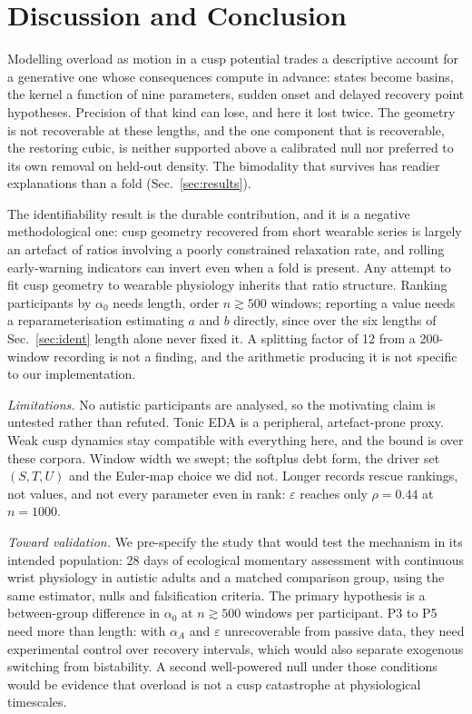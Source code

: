 \documentclass[conference]{IEEEtran}
\begin{document}
\section{Discussion and Conclusion}

Modelling overload as motion in a cusp potential trades a descriptive account
for a generative one whose consequences compute in advance: states become
basins, the kernel a function of nine parameters, sudden onset and delayed
recovery point hypotheses. Precision of that kind can lose, and here it lost twice. The geometry is not
recoverable at these lengths, and the one component that is recoverable, the
restoring cubic, is neither supported above a calibrated null nor preferred to
its own removal on held-out density. The bimodality that survives has readier
explanations than a fold (Sec.~\ref{sec:results}).

The identifiability result is the durable contribution, and it is a negative
methodological one: cusp geometry recovered from short wearable series is
largely an artefact of ratios involving a poorly constrained relaxation rate,
and rolling early-warning indicators can invert even when a fold is present.
Any attempt to fit cusp geometry to wearable physiology inherits that ratio
structure. Ranking participants by $\alpha_0$ needs length, order
$n\gtrsim500$ windows; reporting a value needs a reparameterisation estimating
$a$ and $b$ directly, since over the six lengths of Sec.~\ref{sec:ident} length
alone never fixed it. A splitting factor of 12 from a 200-window recording is
not a finding, and the arithmetic producing it is not specific to our
implementation.

\emph{Limitations.} No autistic participants are analysed, so the motivating claim
is untested rather than refuted. Tonic EDA is a peripheral, artefact-prone
proxy. Weak cusp dynamics stay compatible with everything here, and the bound
is over these corpora. Window width we swept; the softplus debt form, the
driver set $(S,T,U)$ and the Euler-map choice we did not. Longer records rescue
rankings, not values, and not every parameter even in rank: $\varepsilon$
reaches only $\rho=0.44$ at $n=1000$.

\emph{Toward validation.} We pre-specify the study that would test the mechanism in its intended
population: 28 days of ecological momentary assessment with continuous wrist
physiology in autistic adults and a matched comparison group, using the same
estimator, nulls and falsification criteria. The primary hypothesis is a
between-group difference in $\alpha_0$ at $n\gtrsim500$ windows per
participant. P3 to P5 need more than length: with $\alpha_A$ and $\varepsilon$
unrecoverable from passive data, they need experimental control over recovery
intervals, which would also separate exogenous switching from bistability. A
second well-powered null under those conditions would be evidence that overload
is not a cusp catastrophe at physiological timescales.
\end{document}
